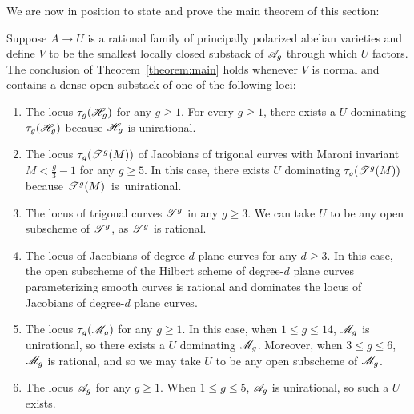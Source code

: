 We are now in position to state and prove the main theorem of this section:
\vspace*{-0.2cm}
\begin{theorem} \label{corollary:examples}
Suppose $A \rightarrow U$ is a rational family of principally polarized abelian varieties
and define $V$ to be the smallest locally closed substack of ${\mathscr A_g}$ through which $U$ factors.
The conclusion of Theorem~\ref{theorem:main} holds whenever $V$ is normal and contains a dense open substack of one of the following loci:
\begin{enumerate}
	       \item[\customlabel{big-hyperelliptic}{(a)}] The locus $\tau_g(\mathscr H_{g})$ for any $g \geq 1$.
		      For every $g \geq 1$, there exists a $U$ dominating $\tau_g(\mathscr H_{g})$ because $\mathscr H_{g}$ is unirational.
               \item[\customlabel{big-maroni}{(b)}] The locus $\tau_g(\mathscr T^{g}(M))$ of Jacobians of trigonal curves with Maroni invariant $M < \frac{g}{3}-1$ for any $g \geq 5$. In this case, there exists $U$ dominating $\tau_g(\mathscr T^{g}(M))$ because \mbox{$\mathscr T^{g}(M)$ is unirational.}
		\item[\customlabel{big-trigonal}{(c)}] The locus of trigonal curves $\mathscr T^{g}$ in any $g \geq 3$.
We can take $U$ to be any open subscheme of $\mathscr T^{g}$, as $\mathscr T^{g}$ is rational.
               \item[\customlabel{big-plane}{(d)}] The locus of Jacobians of degree-$d$ plane curves for any $d \geq 3$. In this case, the open subscheme of the Hilbert scheme
of degree-$d$ plane curves parameterizing smooth curves is rational and dominates the locus of Jacobians of degree-$d$ plane curves.
\item[\customlabel{big-mg}{(e)}] The locus $\tau_g({\mathscr M_g})$ for any $g \geq 1$. In this case, when $1 \leq g \leq 14$, ${\mathscr M_g}$ is unirational, so there exists a $U$ dominating ${\mathscr M_g}$. Moreover, when $3 \leq g \leq 6$, ${\mathscr M_g}$ is rational, and so we may take $U$ to be any open subscheme of ${\mathscr M_g}$.
               \item[\customlabel{big-ag}{(f)}] The locus ${\mathscr A_g}$ for any $g \geq 1$. When $1 \leq g \leq 5$, ${\mathscr A_g}$ is unirational, so such a $U$ exists.
\end{enumerate}
\end{theorem}
